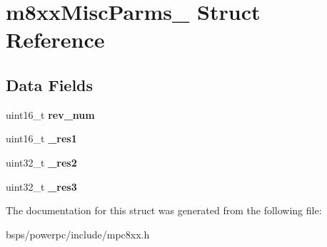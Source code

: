 \hypertarget{structm8xxMiscParms__}{}\section{m8xx\+Misc\+Parms\+\_\+ Struct Reference}
\label{structm8xxMiscParms__}
\subsection*{Data Fields}
\begin{DoxyCompactItemize}
\item 
\mbox{\label{structm8xxMiscParms___aec2a7316952c6890d0b688cc5048e4e3}} 
uint16\+\_\+t {\bfseries rev\+\_\+num}
\item 
\mbox{\label{structm8xxMiscParms___aa012bede51ecaaef2996ff6b735492fb}} 
uint16\+\_\+t {\bfseries \+\_\+res1}
\item 
\mbox{\label{structm8xxMiscParms___aff7ff30f302b95e9c2453690c6ea7a72}} 
uint32\+\_\+t {\bfseries \+\_\+res2}
\item 
\mbox{\label{structm8xxMiscParms___ac678f75b1b539271671f4a549c780f11}} 
uint32\+\_\+t {\bfseries \+\_\+res3}
\end{DoxyCompactItemize}


The documentation for this struct was generated from the following file\+:\begin{DoxyCompactItemize}
\item 
bsps/powerpc/include/mpc8xx.\+h\end{DoxyCompactItemize}
